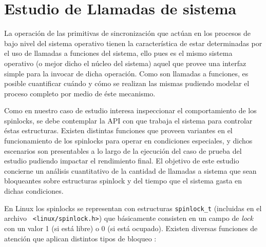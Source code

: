 \section{Estudio de Llamadas de sistema}

La operación de las primitivas de sincronización que actúan en los procesos de bajo nivel del sistema operativo tienen la característica de estar determinadas por el uso de llamadas a funciones del sistema, ello pues es el mismo sistema operativo (o mejor dicho el núcleo del sistema) aquel que provee una interfaz simple para la invocar de dicha operación. Como son llamadas a funciones, es posible cuantificar cuándo y cómo se realizan las mismas pudiendo modelar el proceso completo por medio de éste mecanismo.

Como en nuestro caso de estudio interesa inspeccionar el comportamiento de los spinlocks, se debe contemplar la API con que trabaja el sistema para controlar éstas estructuras. Existen distintas funciones que proveen variantes en el funcionamiento de los spinlocks para operar en condiciones especiales, y dichos escenarios son presentables a lo largo de la ejecución del caso de prueba del estudio pudiendo impactar el rendimiento final. El objetivo de este estudio concierne un análisis cuantitativo de la cantidad de llamadas a sistema que sean bloqueantes sobre estructuras spinlock y del tiempo que el sistema gasta en dichas condiciones.

En Linux los spinlocks se representan con estructuras \verb=spinlock_t= (incluidas en el archivo \verb= <linux/spinlock.h>=) que básicamente consisten en un campo de \emph{lock} con un valor 1 (si está libre) o 0 (si está ocupado). Existen diversas funciones de atención que aplican distintos tipos de bloqueo \cite{book:spinlocks}:

